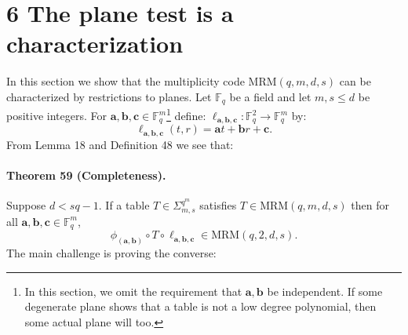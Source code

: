 \section*{6 The plane test is a characterization}
In this section we show that the multiplicity code $\mathrm{MRM}(q,m,d,s)$ can be characterized by restrictions to planes. Let $\mathbb F_q$ be a field and let $m,s\leq d$ be positive integers. For $\boldsymbol a,\boldsymbol b,\boldsymbol c\in\mathbb F_q^m$\footnote{In this section, we omit the requirement that $\boldsymbol a,\boldsymbol b$ be independent. If some degenerate plane shows that a table is not a low degree polynomial, then some actual plane will too.} define: $\ell_{\boldsymbol a,\boldsymbol b,\boldsymbol c}:\mathbb F_q^2\to\mathbb F_q^m$ by:
\[\ell_{\boldsymbol a,\boldsymbol b,\boldsymbol c}(t,r)=\boldsymbol at+\boldsymbol br+\boldsymbol c.\]
From Lemma 18 and Definition 48 we see that:
\paragraph{Theorem 59 (Completeness).} Suppose $d<sq-1$. If a table $T\in\Sigma_{m,s}^{q^m}$ satisfies $T\in\mathrm{MRM}(q,m,d,s)$ then for all $\boldsymbol a,\boldsymbol b,\boldsymbol c\in\mathbb F_q^m$,
\[\phi_{(\boldsymbol a,\boldsymbol b)}\circ T\circ\ell_{\boldsymbol a,\boldsymbol b,\boldsymbol c}\in\mathrm{MRM}(q,2,d,s).\]
The main challenge is proving the converse:
